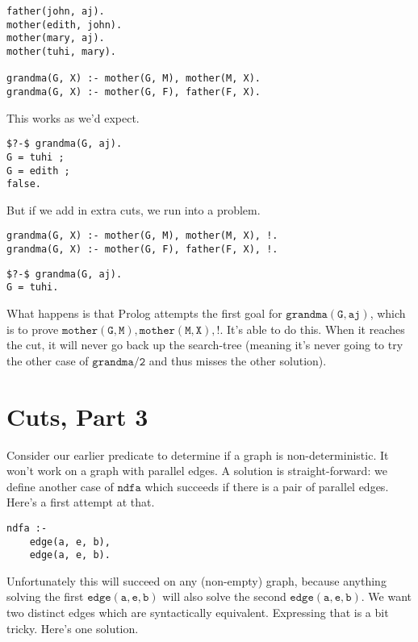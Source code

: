 \documentclass[a4paper,12pt]{article}
\newcommand{\kwa}[1]{\mathtt{#1}}
\begin{document}
\begin{lstlisting}
father(john, aj).
mother(edith, john).
mother(mary, aj).
mother(tuhi, mary).

grandma(G, X) :- mother(G, M), mother(M, X).
grandma(G, X) :- mother(G, F), father(F, X).
\end{lstlisting}

\noindent
This works as we'd expect.

\begin{lstlisting}
$?-$ grandma(G, aj).
G = tuhi ;
G = edith ;
false.
\end{lstlisting}

\noindent
But if we add in extra cuts, we run into a problem.

\begin{lstlisting}
grandma(G, X) :- mother(G, M), mother(M, X), !.
grandma(G, X) :- mother(G, F), father(F, X), !.
\end{lstlisting}

\begin{lstlisting}
$?-$ grandma(G, aj).
G = tuhi.
\end{lstlisting}

\noindent
What happens is that Prolog attempts the first goal for $\kwa{grandma(G, aj)}$, which is to prove $\kwa{mother(G, M), mother(M, X), !}$. It's able to do this. When it reaches the cut, it will never go back up the search-tree (meaning it's never going to try the other case of $\kwa{grandma \slash 2}$ and thus misses the other solution).

\section{Cuts, Part 3}

Consider our earlier predicate to determine if a graph is non-deterministic. It won't work on a graph with parallel edges. A solution is straight-forward: we define another case of $\kwa{ndfa}$ which succeeds if there is a pair of parallel edges. Here's a first attempt at that.

\begin{lstlisting}
ndfa :-
	edge(a, e, b),
	edge(a, e, b).
\end{lstlisting}

Unfortunately this will succeed on any (non-empty) graph, because anything solving the first $\kwa{edge(a, e, b)}$ will also solve the second $\kwa{edge(a, e, b)}$. We want two distinct edges which are syntactically equivalent. Expressing that is a bit tricky. Here's one solution.
\end{document}
